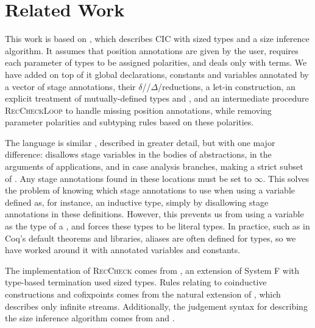\documentclass[nonacm,screen,10pt]{acmart}
\begin{document}
\section{Related Work}\label{sec:related}

This work is based on \CIChat \cite{cic-hat}, which describes CIC with sized types and a size inference algorithm. It assumes that position annotations are given by the user, requires each parameter of \coinductive types to be assigned polarities, and deals only with terms. We have added on top of it global declarations, constants and variables annotated by a vector of stage annotations, their $\delta$\-//$\Delta$\-/reductions, a let-in construction, an explicit treatment of mutually-defined \coinductive types and \cofixpoints, and an intermediate procedure \textsc{RecCheckLoop} to handle missing position annotations, while removing parameter polarities and subtyping rules based on these polarities.

The language \CIChatbar \cite{cic-hat-bar} is similar \CIChat, described in greater detail, but with one major difference: \CIChatbar disallows stage variables in the bodies of abstractions, in the arguments of applications, and in case analysis branches, making \CIChatbar a strict subset of \CIChat. Any stage annotations found in these locations must be set to $\infty$. This solves the problem of knowing which stage annotations to use when using a variable defined as, for instance, an inductive type, simply by disallowing stage annotations in these definitions. However, this prevents us from using a variable as the \corecursive type of a \cofixpoint, and forces these types to be literal \coinductive types. In practice, such as in Coq's default theorems and libraries, aliases are often defined for \coinductive types, so we have worked around it with annotated variables and constants.

The implementation of \textsc{RecCheck} comes from \Fhat \cite{f-hat}, an extension of System F with type-based termination used sized types. Rules relating to coinductive constructions and cofixpoints comes from the natural extension of \CChatomega \cite{cc-hat-omega}, which describes only infinite streams. Additionally, the judgement syntax for describing the size inference algorithm comes from \CChatomega and \CIChatl \cite{cic-hat-l}.
\end{document}
